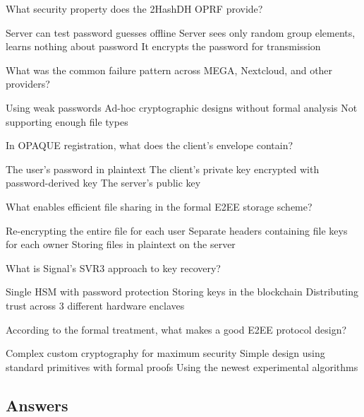 \documentclass[10pt,a4paper,american]{exam}
\begin{document}
\begin{questions}
	\question What security property does the 2HashDH OPRF provide?
	\begin{randomizechoices}
		\choice Server can test password guesses offline
		\CorrectChoice Server sees only random group elements, learns nothing about password
		\choice It encrypts the password for transmission
	\end{randomizechoices}

	\question What was the common failure pattern across MEGA, Nextcloud, and other providers?
	\begin{randomizechoices}
		\choice Using weak passwords
		\CorrectChoice Ad-hoc cryptographic designs without formal analysis
		\choice Not supporting enough file types
	\end{randomizechoices}

	\question In OPAQUE registration, what does the client's envelope contain?
	\begin{randomizechoices}
		\choice The user's password in plaintext
		\CorrectChoice The client's private key encrypted with password-derived key
		\choice The server's public key
	\end{randomizechoices}

	\question What enables efficient file sharing in the formal E2EE storage scheme?
	\begin{randomizechoices}
		\choice Re-encrypting the entire file for each user
		\CorrectChoice Separate headers containing file keys for each owner
		\choice Storing files in plaintext on the server
	\end{randomizechoices}

	\question What is Signal's SVR3 approach to key recovery?
	\begin{randomizechoices}
		\choice Single HSM with password protection
		\choice Storing keys in the blockchain
		\CorrectChoice Distributing trust across 3 different hardware enclaves
	\end{randomizechoices}

	\question According to the formal treatment, what makes a good E2EE protocol design?
	\begin{randomizechoices}
		\choice Complex custom cryptography for maximum security
		\CorrectChoice Simple design using standard primitives with formal proofs
		\choice Using the newest experimental algorithms
	\end{randomizechoices}

\end{questions}

\clearpage

\subsection*{Answers}
\printkeytable
\end{document}
